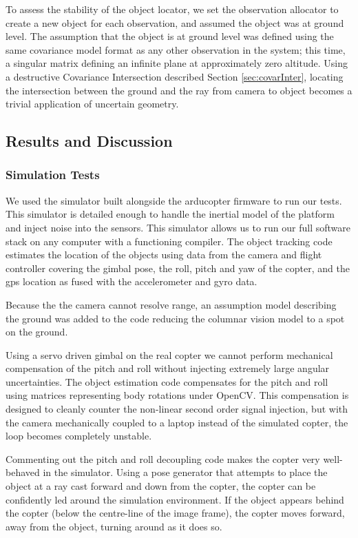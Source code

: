 \documentclass[a4paper, 11pt, titlepage]{article}
\begin{document}
      To assess the stability of the object locator, we set the observation allocator to create a new object for each observation, and assumed the object was at ground level.
      The assumption that the object is at ground level was defined using the same covariance model format as any other observation in the system; this time, a singular matrix defining an infinite plane at approximately zero altitude.
      Using a destructive Covariance Intersection described Section \ref{sec:covarInter}, locating the intersection between the ground and the ray from camera to object becomes a trivial application of uncertain geometry.

  \subsection{Results and Discussion}

    \subsubsection{Simulation Tests}
      We used the simulator built alongside the arducopter firmware to run our tests.  This simulator is detailed enough to handle the inertial model of the platform and inject noise into the sensors.
      This simulator allows us to run our full software stack on any computer with a functioning compiler.
      The object tracking code estimates the location of the objects using data from the camera and flight controller covering the gimbal pose, the roll, pitch and yaw of the copter, and the \gls{gps} location as fused with the accelerometer and gyro data.

      Because the the camera cannot resolve range, an assumption model describing the ground was added to the code reducing the columnar vision model to a spot on the ground.

      Using a servo driven gimbal on the real copter we cannot perform mechanical compensation of the pitch and roll without injecting extremely large angular uncertainties.
      The object estimation code compensates for the pitch and roll using matrices representing body rotations under OpenCV.
      This compensation is designed to cleanly counter the non-linear second order signal injection, but with the camera mechanically coupled to a laptop instead of the simulated copter, the loop becomes completely unstable.

      Commenting out the pitch and roll decoupling code makes the copter very well-behaved in the simulator.  Using a pose generator that attempts to place the object at a ray cast forward and down from the copter, the copter can be confidently led around the simulation environment.  If the object appears behind the copter (below the centre-line of the image frame), the copter moves forward, away from the object, turning around as it does so.
\end{document}
